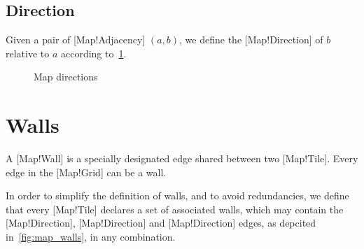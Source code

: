 \subsection{Direction}

Given a pair of [Map!Adjacency] \((a, b)\), we define the [Map!Direction] of \(b\) relative to \(a\) according to~\ref{fig:map_dirs}.

\begin{figure}[htbp]
    \centering
    \caption{Map directions}\label{fig:map_dirs}
\end{figure}

\section{Walls}

A [Map!Wall] is a specially designated edge shared between two [Map!Tile].
Every edge in the [Map!Grid] can be a wall.

In order to simplify the definition of walls, and to avoid redundancies, we define that every [Map!Tile] declares a set of associated walls, which may contain the [Map!Direction], [Map!Direction] and [Map!Direction] edges, as depcited in~\ref{fig:map_walls}, in any combination.

